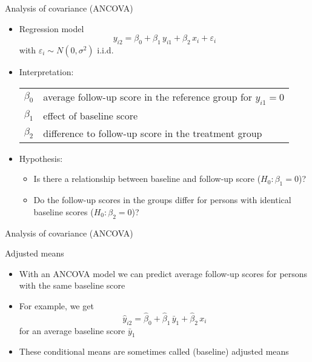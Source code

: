 \documentclass[aspectratio=169]{beamer}
\begin{document}
\begin{frame}{Analysis of covariance (ANCOVA)}
\begin{itemize}
  \item Regression model
    \[
      y_{i2} = \beta_0 + \beta_1 \, y_{i1} + \beta_2 \, x_i + \varepsilon_i
    \]
    with $\varepsilon_i \sim N(0, \sigma^2)$ i.i.d.
  \item Interpretation:
    \begin{tabular}{lp{10cm}}
    $\beta_0$ & average follow-up score in the reference group for $y_{i1} = 0$\\
    $\beta_1$ & effect of baseline score\\
    $\beta_2$ & difference to follow-up score in the treatment group
    \end{tabular}
  \item Hypothesis:
    \begin{itemize}
        \item Is there a relationship between baseline and follow-up score ($H_0\colon \beta_1 = 0$)?
        \item Do the follow-up scores in the groups differ for persons with
          identical baseline scores ($H_0\colon \beta_2 = 0$)?
    \end{itemize}
\end{itemize}
\end{frame}


\begin{frame}{Analysis of covariance (ANCOVA)}
\begin{center}
\end{center}
\end{frame}


\begin{frame}{Adjusted means}
\begin{itemize}
  \item With an ANCOVA model we can predict average follow-up scores for
    persons with the same baseline score
  \item For example, we get
    \[
      \hat{y}_{i2} = \hat{\beta}_0 + \hat{\beta}_1 \, \bar{y}_1 +
                     \hat{\beta}_2 \, x_i
    \]
    for an average baseline score $\bar{y}_1$
\item These conditional means are sometimes called (baseline) adjusted
  means
\end{itemize}
\end{frame}
\end{document}
